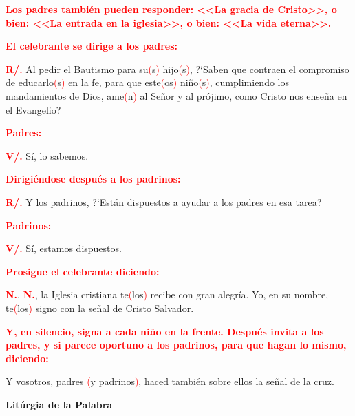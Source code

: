 \documentclass[12pt, letterpaper]{report}
\begin{document}
\large {\bfseries \textcolor{red}{Los padres tambi\'en pueden responder: <<La gracia de Cristo>>, o bien: <<La entrada en la iglesia>>, o bien: <<La vida eterna>>.}}

\large {\bfseries \textcolor{red}{El celebrante se dirige a los padres:}}

\Large {\bfseries \textcolor{red}{R/.}} \hspace{1cm} \Large {Al pedir el Bautismo para su\textcolor{red}{(}s\textcolor{red}{)} hijo\textcolor{red}{(}s\textcolor{red}{)}, ?`Saben que contraen el compromiso de educarlo\textcolor{red}{(}s\textcolor{red}{)} en la fe, para que este\textcolor{red}{(}os\textcolor{red}{)} ni\~no\textcolor{red}{(}s\textcolor{red}{)}, cumplimiendo los mandamientos de Dios, ame\textcolor{red}{(}n\textcolor{red}{)} al Se\~nor y al pr\'ojimo, como Cristo nos ense\~na en el Evangelio?}

\large {\bfseries \textcolor{red}{Padres:}}

{\bfseries \textcolor{red}{V/.}} \hspace{1cm} S\'i, lo sabemos.

\large {\bfseries \textcolor{red}{Dirigi\'endose despu\'es a los padrinos:}}

\Large {\bfseries \textcolor{red}{R/.}} \hspace{1cm} Y los padrinos, ?`Est\'an dispuestos a ayudar a los padres en esa tarea?

\large {\bfseries \textcolor{red}{Padrinos:}}

{\bfseries \textcolor{red}{V/.}} \hspace{1cm} S\'i, estamos dispuestos. 

\large {\bfseries \textcolor{red}{Prosigue el celebrante diciendo:}} 

\Large {\bfseries \textcolor{red}{N.}}, \Large {\bfseries \textcolor{red}{N.}}, \Large {la Iglesia cristiana te\textcolor{red}{(}los\textcolor{red}{)} recibe con gran alegr\'ia. Yo, en su nombre, te\textcolor{red}{(}los\textcolor{red}{)} signo con la se\~nal de Cristo Salvador.}

\large {\bfseries \textcolor{red}{Y, en silencio, signa a cada ni\~no en la frente. Despu\'es invita a los padres, y si parece oportuno a los padrinos, para que hagan lo mismo, diciendo:}} 

\Large {Y vosotros, padres \textcolor{red}{(}y padrinos\textcolor{red}{)}, haced tambi\'en sobre ellos la se\~nal de la cruz.} 

\begin{center}
\Huge {\bfseries Lit\'urgia de la Palabra}
\end{center}
\end{document}
